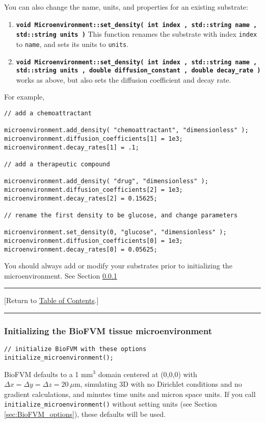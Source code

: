 \documentclass[12pt]{article}
\newcommand{\micron}{\mu\textrm{m}}
\renewcommand{\v}{\verb}
\newcommand{\smallcode}[1]{\textbf{\texttt{#1}}}
\newcommand{\TOClink}{\begin{center}\hrule\vskip-10pt\phantom{.}\hfill[Return to \hyperlink{TOC}{Table of Contents}.]\hfill\phantom{.}\vskip3pt\hrule\end{center}}
\begin{document}
You can also change the name, units, and properties for an existing substrate: 
\begin{enumerate}
\item 
\smallcode{void Microenvironment::set\_density( int index , std::string name , std::string units )} This 
function renames the substrate with index \v|index| to \v|name|, and sets its units to \v|units|. 

\item 
\smallcode{void Microenvironment::set\_density( int index , std::string name , std::string units , 
double diffusion\_constant , double decay\_rate )} works as above, but 
also sets the diffusion coefficient and decay rate. 
\end{enumerate}

For example, 
\begin{verbatim}
// add a chemoattractant 

microenvironment.add_density( "chemoattractant", "dimensionless" ); 
microenvironment.diffusion_coefficients[1] = 1e3; 
microenvironment.decay_rates[1] = .1; 	
	
// add a therapeutic compound
	
microenvironment.add_density( "drug", "dimensionless" ); 
microenvironment.diffusion_coefficients[2] = 1e3; 
microenvironment.decay_rates[2] = 0.15625; 	
	
// rename the first density to be glucose, and change parameters 
	
microenvironment.set_density(0, "glucose", "dimensionless" ); 
microenvironment.diffusion_coefficients[0] = 1e3; 
microenvironment.decay_rates[0] = 0.05625; 	
\end{verbatim}

You should always add or modify your substrates prior to initializing the microenvironment. See 
Section \ref{sec:BioFVM_initialize}

\TOClink 

\subsubsection{Initializing the BioFVM tissue microenvironment}
\label{sec:BioFVM_initialize}

\begin{verbatim}
// initialize BioFVM with these options
initialize_microenvironment(); 	
\end{verbatim}

BioFVM defaults to a 1 mm${}^3$ domain centered at 
(0,0,0) with $\Delta x = \Delta y = \Delta z = 20 \:\micron$, simulating 3D with no Dirichlet conditions 
and no gradient calculations, and minutes time units 
and micron space units. If you call 
\v|initialize_microenvironment()| without setting units (see Section \ref{sec:BioFVM_options}), 
these defaults will be used. 
\end{document}
